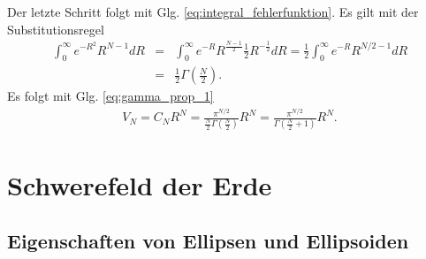\documentclass{book}
\begin{document}
%
Der letzte Schritt folgt mit Glg. \eqref{eq:integral_fehlerfunktion}. Es gilt mit der Substitutionsregel
%
\begin{eqnarray}
\int_{0}^{\infty}e^{-R^2}R^{N - 1}dR & = & \int_{0}^{\infty}e^{-R}R^{\frac{N - 1}{2}}\frac{1}{2}R^{-\frac{1}{2}}dR = \frac{1}{2}\int_{0}^{\infty}e^{-R}R^{N/2 - 1}dR\nonumber\\
& = & \frac{1}{2}\Gamma\left(\frac{N}{2}\right).
\end{eqnarray}
%
Es folgt mit Glg. \eqref{eq:gamma_prop_1}
%
\begin{eqnarray}
V_N = C_NR^{N} = \frac{\pi^{N/2}}{\frac{N}{2}\Gamma\left(\frac{N}{2}\right)}R^N = \frac{\pi^{N/2}}{\Gamma\left(\frac{N}{2} + 1\right)}R^N.\label{eq:volumen_n_dim_kugel}
\end{eqnarray}
%
\section{Schwerefeld der Erde}
\label{secschwerefeld_der_erde}

\subsection{Eigenschaften von Ellipsen und Ellipsoiden}
\label{sec:eigenschaften_von_ellipsen_und_ellipsoiden}
\end{document}
